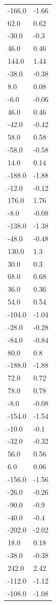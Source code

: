 \begin{longtable}{ll}
-166.0 & -1.66 \\
62.0 & 0.62 \\
-30.0 & -0.3 \\
46.0 & 0.46 \\
144.0 & 1.44 \\
-38.0 & -0.38 \\
8.0 & 0.08 \\
-6.0 & -0.06 \\
46.0 & 0.46 \\
-42.0 & -0.42 \\
58.0 & 0.58 \\
-58.0 & -0.58 \\
14.0 & 0.14 \\
-188.0 & -1.88 \\
-12.0 & -0.12 \\
176.0 & 1.76 \\
-8.0 & -0.08 \\
-138.0 & -1.38 \\
-48.0 & -0.48 \\
130.0 & 1.3 \\
30.0 & 0.3 \\
68.0 & 0.68 \\
36.0 & 0.36 \\
54.0 & 0.54 \\
-104.0 & -1.04 \\
-28.0 & -0.28 \\
-84.0 & -0.84 \\
80.0 & 0.8 \\
-188.0 & -1.88 \\
72.0 & 0.72 \\
78.0 & 0.78 \\
-8.0 & -0.08 \\
-154.0 & -1.54 \\
-10.0 & -0.1 \\
-32.0 & -0.32 \\
56.0 & 0.56 \\
6.0 & 0.06 \\
-156.0 & -1.56 \\
-26.0 & -0.26 \\
-90.0 & -0.9 \\
-40.0 & -0.4 \\
-202.0 & -2.02 \\
18.0 & 0.18 \\
-38.0 & -0.38 \\
242.0 & 2.42 \\
-112.0 & -1.12 \\
-108.0 & -1.08 \\

\end{longtable}
